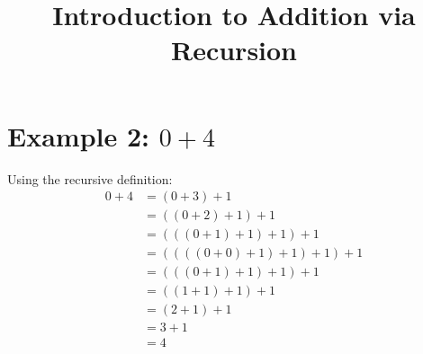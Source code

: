 \documentclass{article}
\title{Introduction to Addition via Recursion}
\author{}
\date{}
\begin{document}
\section{Example 2: \( 0 + 4 \)}
Using the recursive definition:
\[
    \begin{aligned}
        0 + 4 & = (0 + 3) + 1                   \\
              & = ((0 + 2) + 1) + 1             \\
              & = (((0 + 1) + 1) + 1) + 1       \\
              & = ((((0 + 0) + 1) + 1) + 1) + 1 \\
              & = (((0 + 1) + 1) + 1) + 1       \\
              & = ((1 + 1) + 1) + 1             \\
              & = (2 + 1) + 1                   \\
              & = 3 + 1                         \\
              & = 4
    \end{aligned}
\]
\end{document}
